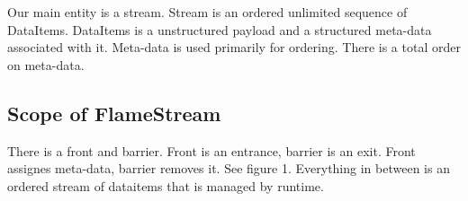 
\label {fs-data-flow}

Our main entity is a stream. Stream is an ordered unlimited sequence of DataItems. DataItems is a unstructured payload and a structured meta-data associated with it. Meta-data is used primarily for ordering. There is a total order on meta-data.

\subsection{Scope of FlameStream}

There is a front and barrier. Front is an entrance, barrier is an exit. Front assignes meta-data, barrier removes it. See figure 1. Everything in between is an ordered stream of dataitems that is managed by runtime. 
